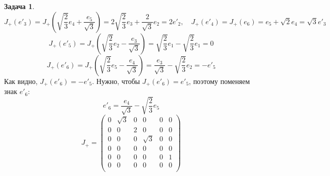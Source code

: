 \documentclass[12pt]{article}
\theoremstyle{definition}
\newtheorem{zad}{Задача}[section]
\begin{document}
\begin{zad}
\begin{equation}
    \end{equation}
    \begin{equation*}
        J_+(e'_3)=J_+\left(\sqrt{\frac{2}{3}}e_4+\frac{e_5}{\sqrt{3}}\right)=2\sqrt{\frac{2}{3}}e_3+\frac{2}{\sqrt{3}}e_2=2e'_2,\quad J_+(e'_4)=J_+(e_6)=e_5+\sqrt{2}e_4=\sqrt{3}e'_3
    \end{equation*}
    \begin{equation}
        J_+(e'_5)=J_+\left(\sqrt{\frac{2}{3}}e_2-\frac{e_3}{\sqrt{3}}\right)=\sqrt{\frac{2}{3}}e_1-\sqrt{\frac{2}{3}}e_1=0
    \end{equation}
    \begin{equation*}
        J_+(e'_6)=J_+\left(\sqrt{\frac{2}{3}}e_5-\frac{e_4}{\sqrt{3}}\right)=\frac{e_3}{\sqrt{3}}-\sqrt{\frac{2}{3}}e_2=-e'_5
    \end{equation*}
    Как видно, $J_+(e'_6)=-e'_5$. Нужно, чтобы $J_+(e'_6)=e'_5$, поэтому поменяем знак $e'_6$:
    \begin{equation}
        e'_6=\frac{e_4}{\sqrt{3}}-\sqrt{\frac{2}{3}}e_5
    \end{equation}
    \begin{equation}
        J_+=\left(
    \begin{array}{cccccc}
    0 & \sqrt{3} & 0 & 0 & 0 & 0\\
    0 & 0 & 2 & 0 & 0 & 0\\
    0 & 0 & 0 & \sqrt{3} & 0 & 0\\
    0 & 0 & 0 & 0 & 0 & 0\\
    0 & 0 & 0 & 0 & 0 & 1\\
    0 & 0 & 0 & 0 & 0 & 0\\
    \end{array}
    \right)
    \end{equation}
    

\end{zad}
\end{document}
